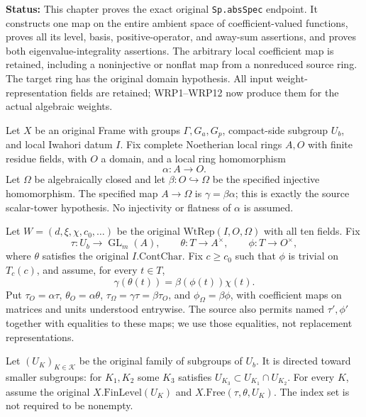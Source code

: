 \documentclass[11pt,a4paper]{article}
\numberwithin{equation}{section}
\theoremstyle{remark}\newtheorem{remark}[theorem]{Remark}
\newcommand{\status}[1]{\textbf{Status:} #1}
\begin{document}
\status{This chapter proves the exact original
\texttt{Sp.\allowbreak abs\allowbreak Spec} endpoint.  It constructs one map on the
entire ambient space of coefficient-valued functions, proves
all its level, basis, positive-operator, and away-sum assertions,
and proves both eigenvalue-integrality assertions.  The arbitrary
local coefficient map is retained, including a noninjective or
nonflat map from a nonreduced source ring.  The target ring has
the original domain hypothesis.  All input weight-representation
fields are retained; WRP1--WRP12 now produce them for the actual
algebraic weights.}

Let $X$ be an original Frame with groups
$\Gamma,\allowbreak{} G_a,\allowbreak{} G_p$, compact-side subgroup $U_b$, and local
Iwahori datum $I$.  Fix complete Noetherian local rings
$A,\allowbreak{} O$ with finite residue fields, with $O$ a domain,
and a local ring homomorphism
\[
 \alpha:A\longrightarrow O.
\]
Let $\Omega$ be algebraically closed and let
$\beta:O\hookrightarrow\Omega$ be the specified injective
homomorphism.  The specified map $A\to\Omega$ is
$\gamma=\beta\alpha$; this is exactly the source scalar-tower
hypothesis.  No injectivity or flatness of $\alpha$ is assumed.

Let $W=(d,\xi,\chi,\allowbreak{} c_0,\ldots)$ be the original
$\mathrm{WtRep}(I,\allowbreak{} O,\Omega)$ with all ten fields.  Fix
\[
 \tau:U_b\longrightarrow\operatorname{GL}_m(A),\qquad
 \theta:T\longrightarrow A^\times,\qquad
 \phi:T\longrightarrow O^\times,
\]
where $\theta$ satisfies the original $I.\mathrm{ContChar}$.
Fix $c\geq c_0$ such that $\phi$ is trivial on $T_c(c)$,
and assume, for every $t\in T$,
\begin{equation}\label{eq:smp-character}
     \gamma(\theta(t))=\beta(\phi(t))\chi(t).
\end{equation}
Put $\tau_O=\alpha\tau$, $\theta_O=\alpha\theta$,
$\tau_\Omega=\gamma\tau=\beta\tau_O$, and
$\phi_\Omega=\beta\phi$, with coefficient maps on matrices
and units understood entrywise.  The source also permits
named $\tau',\phi'$ together with equalities to these maps;
we use those equalities, not replacement representations.

Let $(U_K)_{K\in\mathcal K}$ be the original family of
subgroups of $U_b$.  It is directed toward smaller subgroups:
for $K_1,\allowbreak{} K_2$ some $K_3$ satisfies
$U_{K_3}\subset U_{K_1}\cap U_{K_2}$.
For every $K$, assume the original
$X.\mathrm{FinLevel}(U_K)$ and
$X.\mathrm{Free}(\tau,\theta,\allowbreak{} U_K)$.
The index set is not required to be nonempty.
\end{document}
